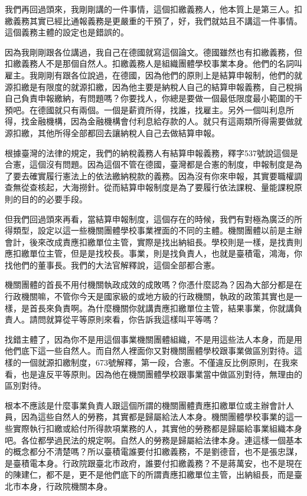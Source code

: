 \documentclass[oneside,sub3section]{ctexbook}
\begin{document}
我們再回過頭來，我剛剛講的一件事情，這個扣繳義務人，他本質上是第三人。扣繳義務其實已經比通報義務是更嚴重的干預了，好，我們就姑且不講這一件事情。這個義務主體的設定也是錯誤的。

因為我剛剛跟各位講過，我自己在德國就寫這個論文。德國雖然也有扣繳義務，但扣繳義務人不是那個自然人。扣繳義務人是組織團體學校事業本身。他們的名詞叫雇主。我剛剛有跟各位說過，在德國，因為他們的原則上是結算申報制，他們的就源扣繳是有限度的就源扣繳，因為他主要是納稅人自己的結算申報義務，自己稅捐自己負責申報繳納，有問題嗎？你要找人，你總是要做一個最低限度最小範圍的干預吧。在德國就只有兩個。一個是薪資所得，找誰，找雇主。另外一個叫利息所得，找金融機構，因為金融機構會付利息給存款的人。就只有這兩類所得需要做就源扣繳，其他所得全部都回去讓納稅人自己去做結算申報。

根據臺灣的法律的規定，我們的納稅義務人有結算申報義務，釋字537號說這個是合憲，這個沒有問題。因為這個不管在德國，臺灣都是合憲的制度，申報制度是為了要去確實履行憲法上的依法繳納稅款的義務。因為沒有你來申報，其實要職權調查無從查核起，大海撈針。從而結算申報制度是為了要履行依法課稅、量能課稅原則的目的的必要手段。

但我們回過頭來再看，當結算申報制度，這個存在的時候，我們有對極為廣泛的所得類型，設定以這一些機關團體學校事業裡面的不同的主體。機關團體以前是主辦會計，後來改成責應扣繳單位主管，實際是找出納組長。學校則是一樣，是找責則應扣繳單位主管，但是是找校長。事業，則是找負責人，也就是臺積電，鴻海，你找他們的董事長。我們的大法官解釋說，這個全部都合憲。

機關團體的首長不用付機關執政成效的成敗嗎？你憑什麼認為？因為大部分都是在行政機關嘛，不管你今天是國家級的或地方級的行政機關，執政的政策其實也是一樣，是首長來負責啊。為什麼機關你就講責應扣繳單位主管，結果事業，你就講負責人。請問就算從平等原則來看，你告訴我這樣叫平等嗎？

找錯主體了，因為你不是用這個事業機關團體組織，不是用這些法人本身，而是用他們底下這一些自然人。而自然人裡面你又對機關團體學校跟事業做區別對待。這樣的一個就源扣繳制度，673號解釋，第一段，合憲。不僅違反比例原則，在我來看，也是違反平等原則。因為他在機關團體學校跟事業當中做區別對待，無理由的區別對待。

根本不應該是什麼事業負責人跟這個所謂的機關團體責應扣繳單位或主辦會計人員，因為這些自然人的勞務，其實都是歸屬給法人本身。機關團體學校事業的這一些實際執行扣繳或給付所得款項業務的人，其實他的勞務都是歸屬給事業組織本身吧。各位都學過民法的規定啊。自然人的勞務是歸屬給法律本身。連這樣一個基本的概念都分不清楚嗎？所以臺積電誰要付扣繳義務，不是劉德音，也不是張忠謀，是臺積電本身。行政院跟臺北市政府，誰要付扣繳義務？不是蔣萬安，也不是現在的陳建仁，都不是，更不是他們底下的所謂責應扣繳單位主管，出納組長，而是臺北市本身，行政院機關本身。
\end{document}
